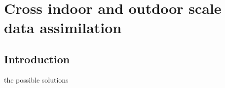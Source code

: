 \chapter{Cross indoor and outdoor scale data assimilation}

\section{Introduction}





the possible solutions 


